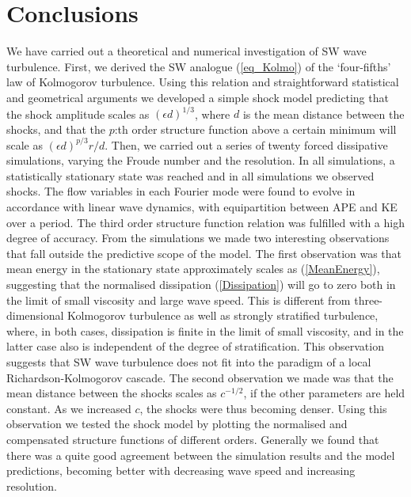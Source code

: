 \documentclass{jfm}
\begin{document}
\section{Conclusions}

We have carried out a theoretical and numerical investigation of SW wave
turbulence. First, we derived the SW analogue (\ref{eq_Kolmo}) of the
`four-fifths' law of Kolmogorov turbulence. Using this relation and
straightforward statistical and geometrical arguments we developed a simple
shock model predicting that the shock amplitude scales as $ (\epsilon d)^{1/3}
$, where $ d $ is the mean distance between the shocks, and that the $ p $:th
order structure function above a certain minimum will scale as $ (\epsilon
d)^{p/3} r/d $. Then, we carried out a series of twenty forced dissipative
simulations, varying the Froude number and the resolution. In all simulations,
a statistically stationary state was reached and in all simulations we
observed shocks. The flow variables in each Fourier mode were found to evolve
in accordance with linear wave dynamics, with equipartition between APE and KE
over a period. The third order structure function relation was fulfilled with a
high degree of accuracy. From the simulations we made two interesting
observations that fall outside the predictive scope of the model. The first
observation was that mean energy in the stationary state approximately scales
as (\ref{MeanEnergy}), suggesting that the normalised dissipation
(\ref{Dissipation}) will go to zero both in the limit of small viscosity and
large wave speed. This is different from three-dimensional Kolmogorov
turbulence as well as strongly stratified turbulence, where, in both cases,
dissipation is finite in the limit of small viscosity, and in the latter case
also is independent of the degree of stratification. This observation suggests
that SW wave turbulence does not fit into the paradigm of a local
Richardson-Kolmogorov cascade. The second observation we made was that the mean
distance between the shocks scales as $ c^{-1/2} $, if the other parameters are
held constant. As we increased $ c $, the shocks were thus becoming denser.
Using this observation we tested the shock model by plotting the normalised and
compensated structure functions of different orders. Generally we found that
there was a quite good agreement between the simulation results and the model
predictions, becoming better with decreasing wave speed and increasing
resolution.
\end{document}
